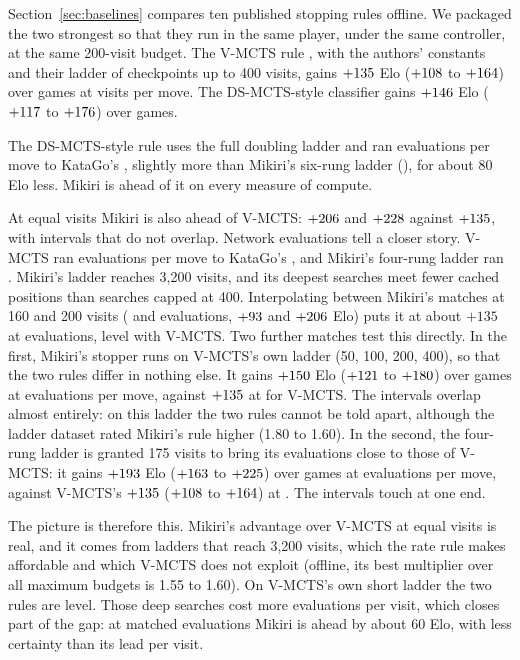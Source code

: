 Section~\ref{sec:baselines} compares ten published stopping rules offline. We packaged the two strongest so that they run in the same player, under the same controller, at the same 200-visit budget. The V-MCTS rule \citep{ye2022spending}, with the authors' constants and their ladder of checkpoints up to 400 visits, gains $+135$ Elo ($+108$ to $+164$) over \vmctsGames{} games at \vmctsVisits{} visits per move. The DS-MCTS-style classifier \citep{lan2021learning} gains $+146$ Elo ($+117$ to $+176$) over \dsmctsGames{} games.

The DS-MCTS-style rule uses the full doubling ladder and ran \dsmctsEvals{} evaluations per move to KataGo's \dsmctsBaseEvals, slightly more than Mikiri's six-rung ladder (\longEvals), for about 80 Elo less. Mikiri is ahead of it on every measure of compute.

At equal visits Mikiri is also ahead of V-MCTS: $+206$ and $+228$ against $+135$, with intervals that do not overlap. Network evaluations tell a closer story. V-MCTS ran \vmctsEvals{} evaluations per move to KataGo's \vmctsBaseEvals, and Mikiri's four-rung ladder ran \mainEvals. Mikiri's ladder reaches 3{,}200 visits, and its deepest searches meet fewer cached positions than searches capped at 400. Interpolating between Mikiri's matches at 160 and 200 visits (\strictEvals{} and \mainEvals{} evaluations, $+93$ and $+206$ Elo) puts it at about $+135$ at \vmctsEvals{} evaluations, level with V-MCTS. Two further matches test this directly. In the first, Mikiri's stopper runs on V-MCTS's own ladder (50, 100, 200, 400), so that the two rules differ in nothing else. It gains $+150$ Elo ($+121$ to $+180$) over \shortGames{} games at \shortEvals{} evaluations per move, against $+135$ at \vmctsEvals{} for V-MCTS. The intervals overlap almost entirely: on this ladder the two rules cannot be told apart, although the ladder dataset rated Mikiri's rule higher (1.80 to 1.60). In the second, the four-rung ladder is granted 175 visits to bring its evaluations close to those of V-MCTS: it gains $+193$ Elo ($+163$ to $+225$) over \midGames{} games at \midEvals{} evaluations per move, against V-MCTS's $+135$ ($+108$ to $+164$) at \vmctsEvals. The intervals touch at one end.

The picture is therefore this. Mikiri's advantage over V-MCTS at equal visits is real, and it comes from ladders that reach 3{,}200 visits, which the rate rule makes affordable and which V-MCTS does not exploit (offline, its best multiplier over all maximum budgets is 1.55 to 1.60). On V-MCTS's own short ladder the two rules are level. Those deep searches cost more evaluations per visit, which closes part of the gap: at matched evaluations Mikiri is ahead by about 60 Elo, with less certainty than its lead per visit.

